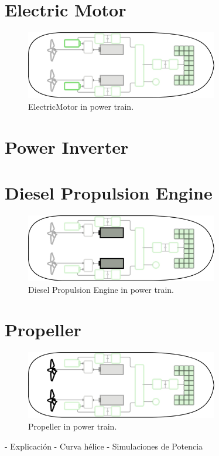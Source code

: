 \section{Electric Motor}

\begin{figure}[h]
    \centering
    \includegraphics[width=0.75\textwidth]{images/chapter05/ElectricMotor_scheme.jpg}
    \caption{ElectricMotor in power train.}
    \label{ElectricMotor}
\end{figure}

\newpage

\section{Power Inverter}

\section{Diesel Propulsion Engine}

\begin{figure}[!ht]
    \centering
    \includegraphics[width=0.75\textwidth]{images/chapter05/DieselEngine_scheme.jpg}
    \caption{Diesel Propulsion Engine in power train.}
    \label{Diesel Engine}
\end{figure}

\section{Propeller}

\begin{figure}[!ht]
    \centering
    \includegraphics[width=0.75\textwidth]{images/chapter05/Propeller_scheme.jpg}
    \caption{Propeller in power train.}
    \label{Propeller}
\end{figure}

- Explicación
- Curva hélice
- Simulaciones de Potencia
